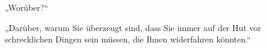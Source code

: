 „Worüber?“

„Darüber, warum Sie überzeugt sind, dass Sie immer auf der Hut vor schrecklichen Dingen sein müssen, die Ihnen widerfahren könnten.“

